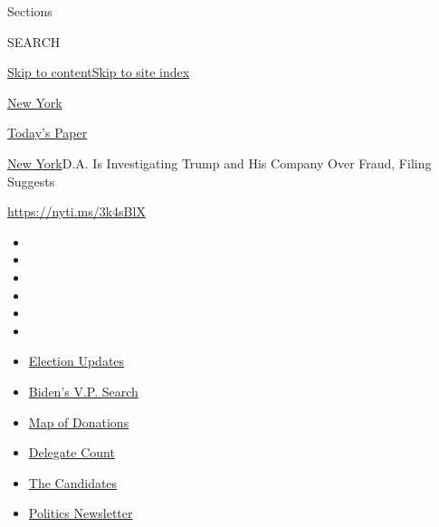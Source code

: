 Sections

SEARCH

\protect\hyperlink{site-content}{Skip to
content}\protect\hyperlink{site-index}{Skip to site index}

\href{https://www.nytimes3xbfgragh.onion/section/nyregion}{New York}

\href{https://myaccount.nytimes3xbfgragh.onion/auth/login?response_type=cookie\&client_id=vi}{}

\href{https://www.nytimes3xbfgragh.onion/section/todayspaper}{Today's
Paper}

\href{/section/nyregion}{New York}\textbar{}D.A. Is Investigating Trump
and His Company Over Fraud, Filing Suggests

\url{https://nyti.ms/3k4sBlX}

\begin{itemize}
\item
\item
\item
\item
\item
\item
\end{itemize}

\begin{itemize}
\item
  \href{https://www.nytimes3xbfgragh.onion/2020/08/03/us/elections/biden-vs-trump.html?action=click\&pgtype=Article\&state=default\&region=TOP_BANNER\&context=storylines_menu}{Election
  Updates}
\item
  \href{https://www.nytimes3xbfgragh.onion/article/biden-vice-president-2020.html?action=click\&pgtype=Article\&state=default\&region=TOP_BANNER\&context=storylines_menu}{Biden's
  V.P. Search}
\item
  \href{https://www.nytimes3xbfgragh.onion/interactive/2020/07/24/us/politics/trump-biden-campaign-donors.html?action=click\&pgtype=Article\&state=default\&region=TOP_BANNER\&context=storylines_menu}{Map
  of Donations}
\item
  \href{https://www.nytimes3xbfgragh.onion/interactive/2020/us/elections/delegate-count-primary-results.html?action=click\&pgtype=Article\&state=default\&region=TOP_BANNER\&context=storylines_menu}{Delegate
  Count}
\item
  \href{https://www.nytimes3xbfgragh.onion/interactive/2019/us/politics/2020-presidential-candidates.html?action=click\&pgtype=Article\&state=default\&region=TOP_BANNER\&context=storylines_menu}{The
  Candidates}
\item
  \href{https://www.nytimes3xbfgragh.onion/newsletters/politics?action=click\&pgtype=Article\&state=default\&region=TOP_BANNER\&context=storylines_menu}{Politics
  Newsletter}
\end{itemize}


